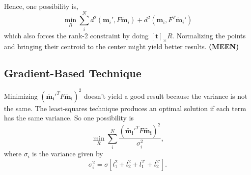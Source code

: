 Hence, one possibility is,
\begin{equation}
\min_R \sum_i^N d^2(\mathbf{m}_i', F\mathbf{\widetilde{m}}_i) + d^2(\mathbf{m}_i, F^T\mathbf{\widetilde{m}}_i')
\end{equation}
which also forces the rank-2 constraint by doing $[\mathbf{t}]_{\times }R$. Normalizing the points and bringing their centroid to the center might yield better results. \textbf{(MEEN)}



\subsection{Gradient-Based Technique}

Minimizing $(\mathbf{\widetilde{m_i}}'^T F \mathbf{\widetilde{m_i}})^2$ doesn't yield a good result because the variance is not the same. The least-squares technique produces an optimal solution if each term has the same variance.
So one possibility is 
\begin{equation}
\min_R \sum_i^N \frac{ (\mathbf{\widetilde{m_i}}'^T F \mathbf{\widetilde{m_i}})^2}{\sigma_i^2},
\end{equation}
where $\sigma_i$ is the variance given by 
\begin{equation}
\sigma_i^2 = \sigma [l_1^2 + l_2^2 + l_1^{2'} + l_2^{2'}].
\end{equation}

